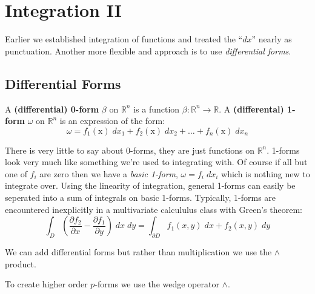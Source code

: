 \chapter{Integration II}

Earlier we established integration of functions and treated the ``$dx$'' nearly as punctuation.
Another more flexible and approach is to use \emph{differential forms}.




%
%

\section{Differential Forms}

\begin{definition}
	A \textbf{(differential) 0-form} $\beta$ on $\mathbb{R}^n$ is a function $\beta : \mathbb{R}^n \to \mathbb{R}$.
	A \textbf{(differental) 1-form} $\omega$ on $\mathbb{R}^n$ is an expression of the form:
	\begin{equation}
		\omega = f_1(\text{x}) \; dx_1 + f_2(\text{x}) \; dx_2 + \ldots + f_n(\text{x}) \; dx_n
	\end{equation}
\end{definition}

There is very little to say about 0-forms, they are just functions on $\mathbb{R}^n$.
1-forms look very much like something we're used to integrating with.
Of course if all but one of $f_i$ are zero then we have a \emph{basic 1-form}, $\omega = f_i \; dx_i$ which is nothing new to integrate over.
Using the linearity of integration, general 1-forms can easily be seperated into a sum of integrals on basic 1-forms.
Typically, 1-forms are encountered inexplicitly in a multivariate calcululus class with Green's theorem:
\begin{equation}
	\tag{Green's Theorem}
	\int_D \left( \frac{\partial f_2}{\partial x} - \frac{\partial f_1}{\partial y}  \right) \;dx\;dy 
	=\int_{\partial D} f_1(x,y) \; dx + f_2(x,y) \; dy
\end{equation}



We can add differential forms but rather than multiplication we use the $\wedge$ product.

To create higher order $p$-forms we use the wedge operator $\wedge$. 


